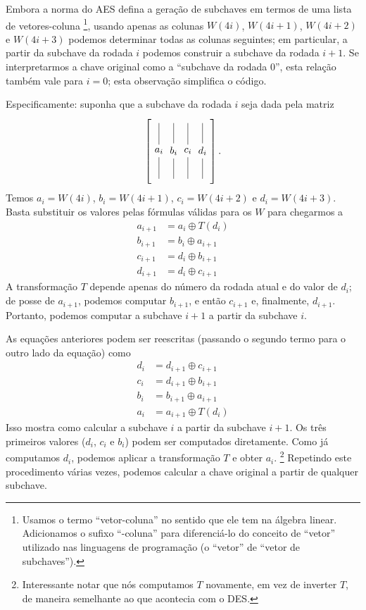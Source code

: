 \documentclass{article}
\newcommand{\xor}{\oplus}
\newcommand{\colvec}[1]{
    \tikz[baseline=-3pt]{
        \node (center) at (0, 0) {$#1$};
        \draw (center) -- (0, 1) (0, 1.2);
        \draw (center) -- (0, -1) (0, -1.2);
    }
}
\begin{document}
Embora a norma do AES defina a geração de subchaves em termos de
uma lista de vetores-coluna%
\footnote{
    Usamos o termo ``vetor-coluna'' no sentido que ele tem na álgebra linear.
    Adicionamos o sufixo ``-coluna'' para diferenciá-lo
    do conceito de ``vetor'' utilizado nas linguagens de programação
    (o ``vetor'' de ``vetor de subchaves'').
},
usando apenas as colunas $W(4i)$, $W(4i+1)$, $W(4i+2)$ e $W(4i+3)$
podemos determinar todas as colunas seguintes;
em particular,
a partir da subchave da rodada $i$
podemos construir a subchave da rodada $i+1$.
Se interpretarmos a chave original como a ``subchave da rodada $0$'',
esta relação também vale para $i = 0$;
esta observação simplifica o código.

Especificamente: suponha que a subchave da rodada $i$
seja dada pela matriz
\begin{equation*}
    \left[ \colvec{a_i} \colvec{b_i} \colvec{c_i} \colvec{d_i} \right].
\end{equation*}
Temos $a_i = W(4i)$, $b_i = W(4i+1)$, $c_i = W(4i+2)$ e $d_i = W(4i+3)$.
Basta substituir os valores pelas fórmulas válidas para os $W$
para chegarmos a
\begin{align*}
    a_{i+1} &= a_i \xor T(d_i) \\
    b_{i+1} &= b_i \xor a_{i+1} \\
    c_{i+1} &= d_i \xor b_{i+1} \\
    d_{i+1} &= d_i \xor c_{i+1}
\end{align*}
A transformação $T$ depende apenas do número da rodada atual e do valor de $d_i$;
de posse de $a_{i+1}$, podemos computar $b_{i+1}$,
e então $c_{i+1}$
e, finalmente, $d_{i+1}$.
Portanto, podemos computar a subchave $i+1$ a partir da subchave $i$.

As equações anteriores podem ser reescritas
(passando o segundo termo para o outro lado da equação)
como
\begin{align*}
    d_i &= d_{i+1} \xor c_{i+1} \\
    c_i &= d_{i+1} \xor b_{i+1} \\
    b_i &= b_{i+1} \xor a_{i+1} \\
    a_i &= a_{i+1} \xor T(d_i)
\end{align*}
Isso mostra como calcular a subchave $i$ a partir da subchave $i+1$.
Os três primeiros valores ($d_i$, $c_i$ e $b_i$)
podem ser computados diretamente.
Como já computamos $d_i$, podemos aplicar a transformação $T$
e obter $a_i$.
\footnote{
    Interessante notar que nós computamos $T$ novamente,
    em vez de inverter $T$,
    de maneira semelhante ao que acontecia com o DES.
}
Repetindo este procedimento várias vezes,
podemos calcular a chave original a partir de qualquer subchave.
\end{document}
